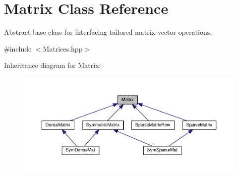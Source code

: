 \hypertarget{class_matrix}{}\section{Matrix Class Reference}
\label{class_matrix}


Abstract base class for interfacing tailored matrix-\/vector operations.  




{\ttfamily \#include $<$Matrices.\+hpp$>$}



Inheritance diagram for Matrix\+:
\nopagebreak
\begin{figure}[H]
\begin{center}
\leavevmode
\includegraphics[width=350pt]{class_matrix__inherit__graph}
\end{center}
\end{figure}
